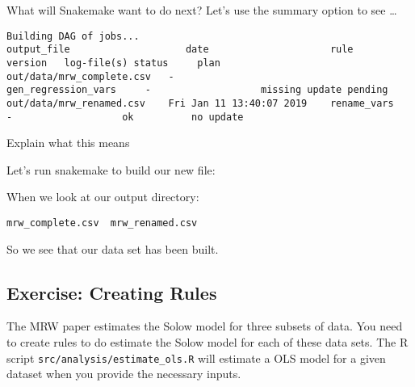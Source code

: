 \documentclass[]{book}
\newenvironment{Shaded}{\begin{snugshade}}{\end{snugshade}}
\newcommand{\KeywordTok}[1]{\textcolor[rgb]{0.13,0.29,0.53}{\textbf{{#1}}}}
\newcommand{\NormalTok}[1]{{#1}}
\theoremstyle{definition}
\theoremstyle{definition}
\theoremstyle{definition}
\theoremstyle{remark}
\begin{document}
What will Snakemake want to do next? Let's use the summary option to see
\ldots{}

\begin{Shaded}
\end{Shaded}

\begin{verbatim}
Building DAG of jobs...
output_file                    date                     rule                  version   log-file(s) status     plan
out/data/mrw_complete.csv   -                           gen_regression_vars     -                   missing update pending
out/data/mrw_renamed.csv    Fri Jan 11 13:40:07 2019    rename_vars             -                   ok          no update
\end{verbatim}

Explain what this means

Let's run snakemake to build our new file:

\begin{Shaded}
\end{Shaded}

When we look at our output directory:

\begin{Shaded}
\end{Shaded}

\begin{verbatim}
mrw_complete.csv  mrw_renamed.csv
\end{verbatim}

So we see that our data set has been built.

\subsection*{Exercise: Creating Rules}\label{exercise-creating-rules}

The MRW paper estimates the Solow model for three subsets of data. You
need to create rules to do estimate the Solow model for each of these
data sets. The R script \texttt{src/analysis/estimate\_ols.R} will
estimate a OLS model for a given dataset when you provide the necessary
inputs.
\end{document}

